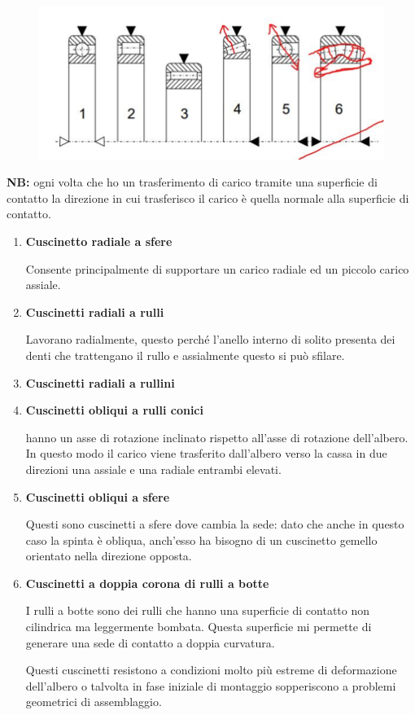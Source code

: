 \documentclass[a4paper, 15pt]{article}
\begin{document}
			\begin{figure}[H]
				\centering
				\includegraphics[width=0.5\linewidth]{immagini/screenshot003}
				\label{fig:screenshot003}
			\end{figure}
			\textbf{NB:} ogni volta che ho un trasferimento di carico tramite una superficie di contatto la direzione in cui trasferisco il carico è quella normale alla superficie di contatto.
			\begin{enumerate}
				\item \textbf{Cuscinetto radiale a sfere} 
				
				Consente principalmente di supportare un carico radiale ed un piccolo carico assiale.
				
				\item \textbf{Cuscinetti radiali a rulli}
				
				Lavorano radialmente, questo perché l’anello interno di solito presenta dei denti che trattengano il rullo e assialmente questo si può sfilare.
				
				\item \textbf{	Cuscinetti radiali a rullini }
				
				\item \textbf{	Cuscinetti obliqui a rulli conici }
				
				hanno un asse di rotazione inclinato rispetto all’asse di rotazione dell’albero. In questo modo il carico viene trasferito dall’albero verso la cassa in due direzioni una assiale e una radiale entrambi elevati.
				
				\item \textbf{Cuscinetti obliqui a sfere }
				
				Questi sono cuscinetti a sfere dove cambia la sede: dato che anche in questo caso la spinta è obliqua, anch’esso ha bisogno di un cuscinetto gemello orientato nella direzione opposta.
				
				\item \textbf{Cuscinetti a doppia corona di rulli a botte }
				
				I rulli a botte sono dei rulli che hanno una superficie di contatto non cilindrica ma leggermente bombata. Questa superficie mi permette di generare una sede di contatto a doppia curvatura. 
				
				Questi cuscinetti resistono a condizioni molto più estreme di deformazione dell’albero o talvolta in fase iniziale di montaggio sopperiscono a problemi geometrici di assemblaggio.
			\end{enumerate}
			\newpage			
\end{document}
